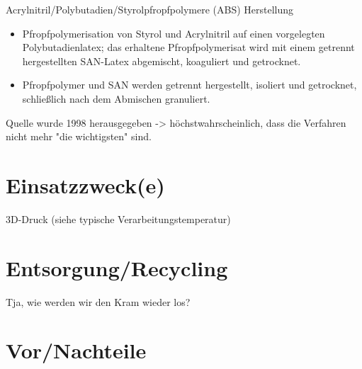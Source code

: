     Acrylnitril/Polybutadien/Styrolpfropfpolymere (ABS)
    Herstellung
    \begin{itemize}
        \item Pfropfpolymerisation von Styrol und Acrylnitril auf einen vorgelegten Polybutadienlatex; das erhaltene Pfropfpolymerisat
        wird mit einem getrennt hergestellten SAN-Latex abgemischt, koaguliert und getrocknet. \cite{Domininghaus.1998}
        \item Pfropfpolymer und SAN werden getrennt hergestellt, isoliert und getrocknet, schließlich nach dem Abmischen granuliert. \cite{Domininghaus.1998}
    \end{itemize}
    Quelle wurde 1998 herausgegeben -> höchstwahrscheinlich, dass die Verfahren nicht mehr "die wichtigsten" sind.

    \section*{Einsatzzweck(e)}
    3D-Druck (siehe typische Verarbeitungstemperatur)

    \section*{Entsorgung/Recycling}
    Tja, wie werden wir den Kram wieder los?

    \section*{Vor/Nachteile}